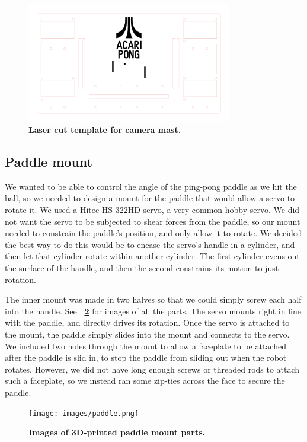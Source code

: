 \documentclass[letterpaper, 11pt]{article}
\newcommand*{\figref}[1]{\textbf{\figurename~\ref{#1}}}
\begin{document}
\begin{enumerate}[label=\textbf{\arabic*.}]
\begin{figure}[ht]
    \centering
    \includegraphics[width=0.8\textwidth]{images/mast.png}
    \caption{\textbf{Laser cut template for camera mast.}}
    \label{fig:mast}
\end{figure}

\subsection{Paddle mount}
We wanted to be able to control the angle of the ping-pong paddle as we hit the ball, so we needed to design a mount for the paddle that would allow a servo to rotate it. We used a Hitec HS-322HD servo, a very common hobby servo. We did not want the servo to be subjected to shear forces from the paddle, so our mount needed to constrain the paddle’s position, and only allow it to rotate. We decided the best way to do this would be to encase the servo's handle in a cylinder, and then let that cylinder rotate within another cylinder. The first cylinder evens out the surface of the handle, and then the second constrains its motion to just rotation.

The inner mount was made in two halves so that we could simply screw each half into the handle. See \figref{fig:paddle} for images of all the parts. The servo mounts right in line with the paddle, and directly drives its rotation. Once the servo is attached to the mount, the paddle simply slides into the mount and connects to the servo. We included two holes through the mount to allow a faceplate to be attached after the paddle is slid in, to stop the paddle from sliding out when the robot rotates. However, we did not have long enough screws or threaded rods to attach such a faceplate, so we instead ran some zip-ties across the face to secure the paddle.

\begin{figure}[ht]
    \centering
    \texttt{[image: images/paddle.png]}
    \caption{\textbf{Images of 3D-printed paddle mount parts.}}
    \label{fig:paddle}
\end{figure}


\end{enumerate}
\end{document}
